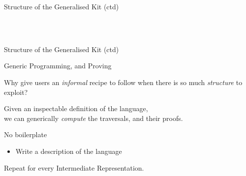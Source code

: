\documentclass{beamer}
\begin{document}
\begin{frame}{Structure of the Generalised Kit (ctd)}

  \vfill

  \\~~~~~~
  \begin{minipage}{0.9\textwidth}
  \vspace{.1em}
  \end{minipage}
\end{frame}

\begin{frame}{Structure of the Generalised Kit (ctd)}



\end{frame}

\begin{frame}{Generic Programming, and Proving}

  Why give users an \emph{informal} recipe to follow when there
  is so much \emph{structure} to exploit?

  \vfill

  Given an inspectable definition of the language,\\
  we can generically \emph{compute} the traversals, and their proofs.
\end{frame}

\begin{frame}{No boilerplate}

  \begin{itemize}
    \item Write a description of the language
  \end{itemize}

  \vfill

  Repeat for every Intermediate Representation.

\end{frame}
\end{document}
